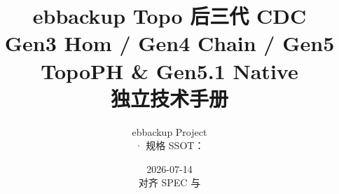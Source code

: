 \documentclass[12pt,a4paper,openany]{ctexbook}
\title{ebbackup Topo 后三代 CDC\\[0.35em]
  \large Gen3 Hom / Gen4 Chain / Gen5 TopoPH \& Gen5.1 Native\\[0.2em]
  \normalsize 独立技术手册}
\author{ebbackup Project\\\filepath{engine\_cpp/} · 规格 SSOT：\filepath{docs/technical/TOPO\_*.md}}
\date{2026-07-14\\{\small 对齐 SPEC 与 \filepath{CDC\_ALGO\_MATRIX.md}}}
\begin{document}
\frontmatter
\maketitle

\tableofcontents
\listoffigures
\listoftables
\lstlistoflistings

\mainmatter













\appendix


\backmatter
\end{document}
